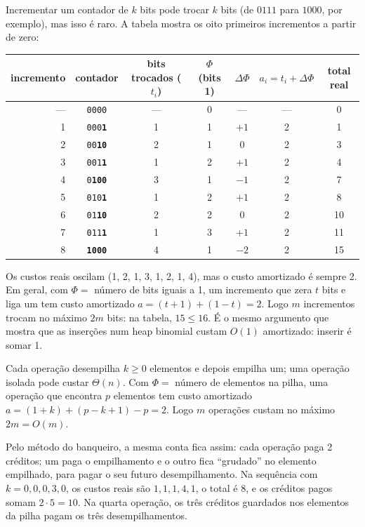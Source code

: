 \begin{exemplo}\label{ex:contador}
Incrementar um contador de $k$ bits pode trocar $k$ bits (de $0111$ para $1000$, por exemplo), mas isso é raro. A tabela mostra os oito primeiros incrementos a partir de zero:
\begin{center}\small
\begin{tabular}{@{}rcccccc@{}}
\toprule
incremento & contador & bits trocados ($t_i$) & $\Phi$ (bits 1) & $\Delta\Phi$ & $a_i=t_i+\Delta\Phi$ & total real\\
\midrule
--- & \texttt{0000} & --- & 0 & --- & --- & 0\\
1 & \texttt{000\textbf{1}} & 1 & 1 & $+1$ & 2 & 1\\
2 & \texttt{00\textbf{10}} & 2 & 1 & $0$ & 2 & 3\\
3 & \texttt{001\textbf{1}} & 1 & 2 & $+1$ & 2 & 4\\
4 & \texttt{0\textbf{100}} & 3 & 1 & $-1$ & 2 & 7\\
5 & \texttt{010\textbf{1}} & 1 & 2 & $+1$ & 2 & 8\\
6 & \texttt{01\textbf{10}} & 2 & 2 & $0$ & 2 & 10\\
7 & \texttt{011\textbf{1}} & 1 & 3 & $+1$ & 2 & 11\\
8 & \texttt{\textbf{1000}} & 4 & 1 & $-2$ & 2 & 15\\
\bottomrule
\end{tabular}
\end{center}
Os custos reais oscilam (1, 2, 1, 3, 1, 2, 1, 4), mas o custo amortizado é sempre 2. Em geral, com $\Phi=$ número de bits iguais a 1, um incremento que zera $t$ bits e liga um tem custo amortizado $a=(t+1)+(1-t)=2$. Logo $m$ incrementos trocam no máximo $2m$ bits: na tabela, $15\le16$. É o mesmo argumento que mostra que as inserções num heap binomial custam $O(1)$ amortizado: inserir é somar 1.
\end{exemplo}

\begin{exemplo}\label{ex:pilha}
Cada operação desempilha $k\ge0$ elementos e depois empilha um; uma operação isolada pode custar $\Theta(n)$. Com $\Phi=$ número de elementos na pilha, uma operação que encontra $p$ elementos tem custo amortizado $a=(1+k)+(p-k+1)-p=2$. Logo $m$ operações custam no máximo $2m=O(m)$.

Pelo método do banqueiro, a mesma conta fica assim: cada operação paga 2 créditos; um paga o empilhamento e o outro fica ``grudado'' no elemento empilhado, para pagar o seu futuro desempilhamento. Na sequência com $k=0,0,0,3,0$, os custos reais são $1,1,1,4,1$, o total é $8$, e os créditos pagos somam $2\cdot5=10$. Na quarta operação, os três créditos guardados nos elementos da pilha pagam os três desempilhamentos.
\end{exemplo}

